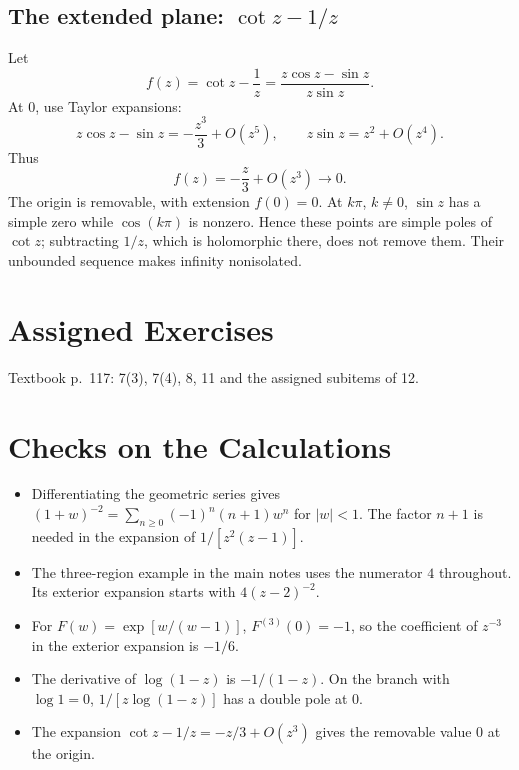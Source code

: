 \documentclass[11pt,a4paper]{article}
\theoremstyle{definition}
\theoremstyle{plain}
\begin{document}
\subsection{The extended plane: \texorpdfstring{$\cot z-1/z$}{cot(z)-1/z}}
Let
\begin{equation}\label{eq:25}
f(z)=\cot z-\frac1z
     =\frac{z\cos z-\sin z}{z\sin z}.
\end{equation}
At $0$, use Taylor expansions:
\begin{equation}\label{eq:26}
z\cos z-\sin z=-\frac{z^3}{3}+O(z^5),\qquad
 z\sin z=z^2+O(z^4).
\end{equation}
Thus
\begin{equation}\label{eq:27}
f(z)=-\frac z3+O(z^3)\longrightarrow0.
\end{equation}
The origin is removable, with extension $f(0)=0$.
At $k\pi$, $k\neq0$, $\sin z$ has a simple zero while $\cos(k\pi)$
is nonzero. Hence these points are simple poles of $\cot z$;
subtracting $1/z$, which is holomorphic there, does not remove them.
Their unbounded sequence makes infinity nonisolated.

\section{Assigned Exercises}
Textbook p.~117: 7(3), 7(4), 8, 11 and the assigned subitems of 12.

\section{Checks on the Calculations}
\begin{itemize}
\item Differentiating the geometric series gives
      $(1+w)^{-2}=\sum_{n\geq0}(-1)^n(n+1)w^n$ for $|w|<1$.
      The factor $n+1$ is needed in the expansion of $1/[z^2(z-1)]$.
\item The three-region example in the main notes uses the numerator $4$
      throughout. Its exterior expansion starts with $4(z-2)^{-2}$.
\item For $F(w)=\exp[w/(w-1)]$, $F^{(3)}(0)=-1$, so the coefficient of
      $z^{-3}$ in the exterior expansion is $-1/6$.
\item The derivative of $\log(1-z)$ is $-1/(1-z)$. On the branch with
      $\log1=0$, $1/[z\log(1-z)]$ has a double pole at $0$.
\item The expansion $\cot z-1/z=-z/3+O(z^3)$ gives the removable value
      $0$ at the origin.
\end{itemize}
\end{document}
